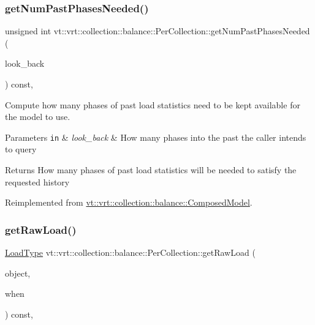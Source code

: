 \subsubsection{\texorpdfstring{get\+Num\+Past\+Phases\+Needed()}{getNumPastPhasesNeeded()}}
{\footnotesize\ttfamily unsigned int vt\+::vrt\+::collection\+::balance\+::\+Per\+Collection\+::get\+Num\+Past\+Phases\+Needed (\begin{DoxyParamCaption}\item[{unsigned int}]{look\+\_\+back }\end{DoxyParamCaption}) const\hspace{0.3cm}{\ttfamily [override]}, {\ttfamily [virtual]}}



Compute how many phases of past load statistics need to be kept available for the model to use. 


\begin{DoxyParams}[1]{Parameters}
\mbox{\tt in}  & {\em look\+\_\+back} & How many phases into the past the caller intends to query\\
\hline
\end{DoxyParams}
\begin{DoxyReturn}{Returns}
How many phases of past load statistics will be needed to satisfy the requested history 
\end{DoxyReturn}


Reimplemented from \hyperlink{classvt_1_1vrt_1_1collection_1_1balance_1_1_composed_model_a20bb994d1b3b27eb2a82729d7d5c30f3}{vt\+::vrt\+::collection\+::balance\+::\+Composed\+Model}.

\mbox{\label{structvt_1_1vrt_1_1collection_1_1balance_1_1_per_collection_aed857aa2da3e7dc339236a1953b9747a}} 
\subsubsection{\texorpdfstring{get\+Raw\+Load()}{getRawLoad()}}
{\footnotesize\ttfamily \hyperlink{namespacevt_a8fb51741340b87d7aaee0bef60e9896b}{Load\+Type} vt\+::vrt\+::collection\+::balance\+::\+Per\+Collection\+::get\+Raw\+Load (\begin{DoxyParamCaption}\item[{\hyperlink{namespacevt_1_1vrt_1_1collection_1_1balance_a9f5b53fafb270212279a4757d2c4cd28}{Element\+I\+D\+Struct}}]{object,  }\item[{\hyperlink{structvt_1_1vrt_1_1collection_1_1balance_1_1_phase_offset}{Phase\+Offset}}]{when }\end{DoxyParamCaption}) const\hspace{0.3cm}{\ttfamily [override]}, {\ttfamily [virtual]}}



